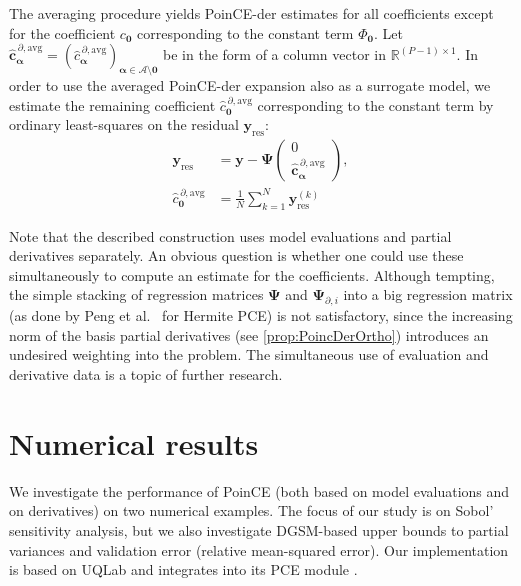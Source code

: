 \documentclass[a4paper,11pt]{article}
\newcommand{\curlyA}{{\mathcal A}}
\newcommand{\Rr}{{\mathbb R}}
\newcommand{\ve}[1]{\boldsymbol{#1}}
\newcommand{\alp}{{\ve{\alpha}}}
\renewcommand{\citep}[2][]{\cite[#1]{#2}}
\renewcommand{\citet}[2][]{\cite[#1]{#2}}
\theoremstyle{definition}
\theoremstyle{remark}
\theoremstyle{theorem}
\begin{document}
The averaging procedure yields PoinCE-der estimates for all coefficients except for the coefficient $c_{\ve 0}$ corresponding to the constant term $\Phi_{\ve 0}$.
Let $\hat{\ve{c}}_{\alp}^{\, \partial, \text{avg}} = (\hat{c}_\alp^{\, \partial, \text{avg}})_{\alp \in \curlyA \setminus \ve{0}}$ be in the form of a column vector in $\Rr^{(P-1) \times 1}$.
In order to use the averaged PoinCE-der expansion also as a surrogate model, we estimate the remaining coefficient $\hat{c}_{\ve{0}}^{\, \partial, \text{avg}}$ corresponding to the constant term by ordinary least-squares on the residual $\ve{y}_\text{res}$:
	\begin{align*}
	\ve{y}_\text{res} &= \ve{y} - \ve\Psi \begin{pmatrix} 0 \\ \hat{\ve{c}}_{\alp}^{\, \partial, \text{avg}} \end{pmatrix}, \\
	\hat{c}_{\ve{0}}^{\, \partial, \text{avg}} &= \frac{1}{N} \sum_{k=1}^{N} \ve{y}_\text{res}^{(k)}
	\end{align*}

Note that the described construction uses model evaluations and partial derivatives separately. An obvious question is whether one could use these simultaneously to compute an estimate for the coefficients. Although tempting, the simple stacking of regression matrices $\ve\Psi$ and $\ve \Psi_{\partial, i}$ into a big regression matrix (as done by Peng et al.~\citet{penham16} for Hermite PCE) is not satisfactory, since the increasing norm of the basis partial derivatives (see \cref{prop:PoincDerOrtho}) introduces an undesired weighting into the problem. The simultaneous use of evaluation and derivative data is a topic of further research.

\section{Numerical results} \label{sec:numerical}

We investigate the performance of PoinCE (both based on model evaluations and on derivatives) on two numerical examples. The focus of our study is on Sobol' sensitivity analysis, but we also investigate DGSM-based upper bounds to partial variances and validation error (relative mean-squared error). %
Our implementation is based on UQLab \citep{MarelliUQLab2014} and integrates into its PCE module \citep{UQdocPCE}.
\end{document}
